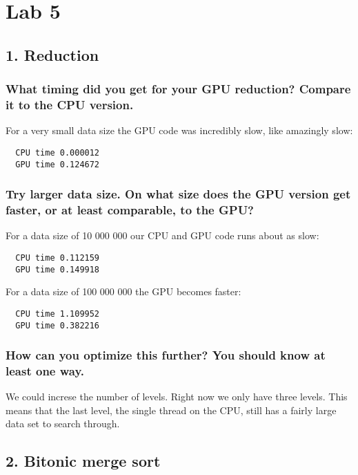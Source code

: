 \documentclass[a4paper,12pt]{article}
\begin{document}
\section{Lab 5}

\subsection{1. Reduction}

\subsubsection{What timing did you get for your GPU reduction? Compare it to the CPU version.}

For a very small data size the GPU code was incredibly slow, like amazingly slow:

\begin{lstlisting}
  CPU time 0.000012
  GPU time 0.124672
\end{lstlisting}


\subsubsection{Try larger data size. On what size does the GPU version get faster, or at least comparable, to the GPU?}

For a data size of 10 000 000 our CPU and GPU code runs about as slow:

\begin{lstlisting}
  CPU time 0.112159
  GPU time 0.149918
\end{lstlisting}

For a data size of 100 000 000 the GPU becomes faster:

\begin{lstlisting}
  CPU time 1.109952
  GPU time 0.382216
\end{lstlisting}


\subsubsection{How can you optimize this further? You should know at least one way.}

We could increse the number of levels. Right now we only have three levels. This means that the last level, the single thread on the CPU, still has a fairly large data set to search through.




\subsection{2. Bitonic merge sort}
\end{document}
